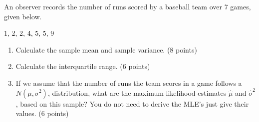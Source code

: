 \item An observer records the number of runs scored by a baseball team over 7 games, given below.

1, 2, 2, 4, 5, 5, 9

\begin{enumerate}
\item Calculate the sample mean and sample variance. (8 points)

\vfill
\item Calculate the interquartile range. (6 points)

\vfill
\item If we assume that the number of runs the team scores in a game follows a $N(\mu, \sigma^2)$, distribution, what are the maximum likelihood estimates $\hat{\mu}$ and $\hat{\sigma}^2$, based on this sample? You do not need to derive the MLE's just give their values. (6 points)

\vfill
\end{enumerate}